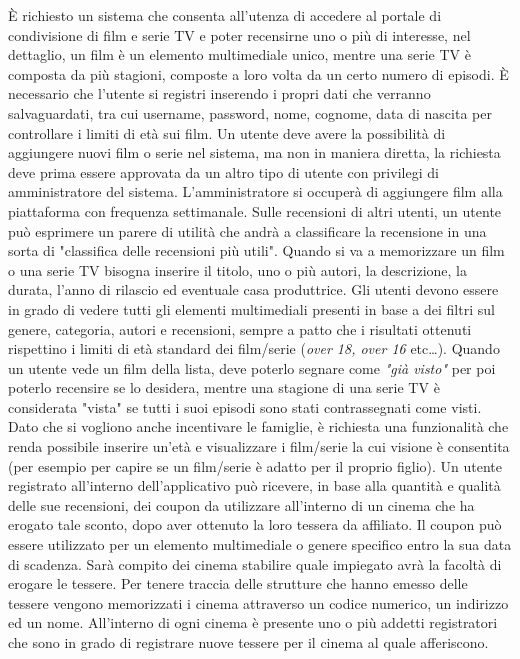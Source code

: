 \documentclass[a4paper,12pt]{report}
\begin{document}
	È richiesto un sistema che consenta all'utenza di accedere al portale di condivisione di film e serie TV e poter recensirne uno o più di interesse, nel dettaglio, un film è un elemento multimediale unico, mentre una serie TV è composta da più stagioni, composte a loro volta da un certo numero di episodi. È necessario che l'utente si registri inserendo i propri dati che verranno salvaguardati, tra cui username, password, nome, cognome, data di nascita per controllare i limiti di età sui film. Un utente deve avere la possibilità di aggiungere nuovi film o serie nel sistema, ma non in maniera diretta, la richiesta deve prima essere approvata da un altro tipo di utente con privilegi di amministratore del sistema. L'amministratore si occuperà di aggiungere film alla piattaforma con frequenza settimanale. Sulle recensioni di altri utenti, un utente può esprimere un parere di utilità che andrà a classificare la recensione in una sorta di "classifica delle recensioni più utili". Quando si va a memorizzare un film o una serie TV bisogna inserire il titolo, uno o più autori, la descrizione, la durata, l'anno di rilascio ed eventuale casa produttrice. Gli utenti devono essere in grado di vedere tutti gli elementi multimediali presenti in base a dei filtri sul genere, categoria, autori e recensioni, sempre a patto che i risultati ottenuti rispettino i limiti di età standard dei film/serie (\textit{over 18, over 16} etc\dots). Quando un utente vede un film della lista, deve poterlo segnare come \textit{"già visto"} per poi poterlo recensire se lo desidera, mentre una stagione di una serie TV è considerata "vista" se tutti i suoi episodi sono stati contrassegnati come visti. Dato che si vogliono anche incentivare le famiglie, è richiesta una funzionalità che renda possibile inserire un'età e visualizzare i film/serie la cui visione è consentita (per esempio per capire se un film/serie è adatto per il proprio figlio). Un utente registrato all'interno dell'applicativo può ricevere, in base alla quantità e qualità delle sue recensioni, dei coupon da utilizzare all'interno di un cinema che ha erogato tale sconto, dopo aver ottenuto la loro tessera da affiliato. Il coupon può essere utilizzato per un elemento multimediale o genere specifico entro la sua data di scadenza. Sarà compito dei cinema stabilire quale impiegato avrà la facoltà di erogare le tessere. Per tenere traccia delle strutture che hanno emesso delle tessere vengono memorizzati i cinema attraverso un codice numerico, un indirizzo ed un nome. All'interno di ogni cinema è presente uno o più addetti registratori che sono in grado di registrare nuove tessere per il cinema al quale afferiscono.
\end{document}
